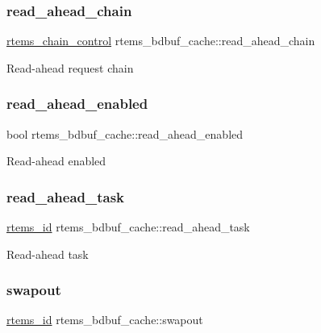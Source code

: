 \subsubsection{\texorpdfstring{read\_ahead\_chain}{read\_ahead\_chain}}
{\footnotesize\ttfamily \mbox{\hyperlink{unionChain__Control}{rtems\+\_\+chain\+\_\+control}} rtems\+\_\+bdbuf\+\_\+cache\+::read\+\_\+ahead\+\_\+chain}

Read-\/ahead request chain \mbox{\label{structrtems__bdbuf__cache_addc44cd99fd18d9f00e24bda374d89b1}} 
\subsubsection{\texorpdfstring{read\_ahead\_enabled}{read\_ahead\_enabled}}
{\footnotesize\ttfamily bool rtems\+\_\+bdbuf\+\_\+cache\+::read\+\_\+ahead\+\_\+enabled}

Read-\/ahead enabled \mbox{\label{structrtems__bdbuf__cache_a66aeb87e41709c60a578934f8e260e13}} 
\subsubsection{\texorpdfstring{read\_ahead\_task}{read\_ahead\_task}}
{\footnotesize\ttfamily \mbox{\hyperlink{group__ClassicTasks_gab20892b814dced7dd4e5b9bf42becd57}{rtems\+\_\+id}} rtems\+\_\+bdbuf\+\_\+cache\+::read\+\_\+ahead\+\_\+task}

Read-\/ahead task \mbox{\label{structrtems__bdbuf__cache_a900cf94bc5008688aa29f3b13b5037ea}} 
\subsubsection{\texorpdfstring{swapout}{swapout}}
{\footnotesize\ttfamily \mbox{\hyperlink{group__ClassicTasks_gab20892b814dced7dd4e5b9bf42becd57}{rtems\+\_\+id}} rtems\+\_\+bdbuf\+\_\+cache\+::swapout}

